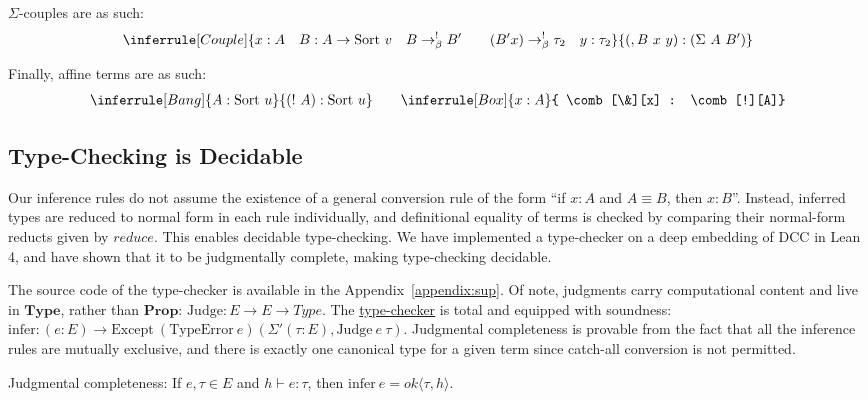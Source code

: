 \documentclass{lmcs}
\newcommand{\tinfer}{\text{infer}}
\newcommand{\arr}{\rightarrow}
\newcommand{\sort}[1]{\text{Sort}\ #1}
\newcommand{\barr}{\arr_{\beta}}
\begin{document}
\begin{defi}
  \(\Sigma\)-couples are as such:
  \[
    \inferrule[Couple]
    { x : A \quad B : A \rightarrow \sort{v} \quad B \barr^{!} B' \qquad (B' x) \barr^{!} \tau_2 \quad y : \tau_2}
    { \comb[,B][x][y] : \comb[\Sigma][A][B']}
  \]
\end{defi}

\begin{defi}
  Finally, affine terms are as such:
  \[
    \begin{gathered}
      \inferrule[Bang]
      { A : \sort{u}}
      { \comb[!][A] : \sort{u}} \qquad
      \inferrule[Box]
      { x : A}
      { \comb[\&][x] : \comb[!][A]}
    \end{gathered}
  \]
\end{defi}

\subsection{Type-Checking is Decidable}\label{decidable}

Our inference rules do not assume the existence of a general conversion rule of the form ``if \(x : A\) and \(A \equiv B\), then \(x : B\)''. Instead, inferred types are reduced to normal form in each rule individually, and definitional equality of terms is checked by comparing their normal-form reducts given by \(reduce\). This enables decidable type-checking. We have implemented a type-checker on a deep embedding of DCC in Lean 4, and have shown that it to be judgmentally complete, making type-checking decidable.

The source code of the type-checker is available in the Appendix~\ref{appendix:sup}. Of note, judgments carry computational content and live in \(\textbf{Type}\), rather than \(\textbf{Prop}\): \(\text{Judge} : E \rightarrow E \rightarrow Type\). The \href{https://github.com/lexzaiello/DCC/blob/Dcc/Judge.lean#L599}{type-checker} is total and equipped with soundness: \(\tinfer : (e : E) \rightarrow \text{Except}\ (\text{TypeError}\ e) (\Sigma' (\tau : E), \text{Judge}\ e\ \tau)\). Judgmental completeness is provable from the fact that all the inference rules are mutually exclusive, and there is exactly one canonical type for a given term since catch-all conversion is not permitted.

\begin{thm}\label{thm:judgecomplete}
  Judgmental completeness: If \(e, \tau \in E\) and \(h \vdash e : \tau\), then \(\tinfer\ e = ok \langle \tau, h \rangle\).
\end{thm}
\end{document}
